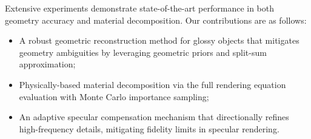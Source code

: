 Extensive experiments demonstrate state-of-the-art performance in both geometry accuracy and material decomposition. Our contributions are as follows:
\begin{itemize}
    \item A robust geometric reconstruction method for glossy objects that mitigates geometry ambiguities by leveraging geometric priors and split-sum approximation; 
    \item Physically-based material decomposition via the full rendering equation evaluation with Monte Carlo importance sampling;
    \item An adaptive specular compensation mechanism that directionally refines high-frequency details, mitigating fidelity limits in specular rendering.
\end{itemize}